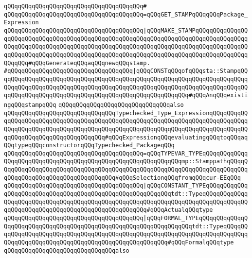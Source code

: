 \verb|qQQqqQQqqQQqqQQqqQQqqQQqqQQqqQQqqQQqqQQq#|\newline
\verb|qQQqqQQqqQQqqQQqqQQqqQQqqQQqqQQqqQQqqQQq=qQQqGET_STAMPqQQqqQQqPackage_Expression|\newline
\verb|qQQqqQQqqQQqqQQqqQQqqQQqqQQqqQQqqQQqqQQq|\verb#|qQQqMAKE_STAMPqQQqqQQqqQQqqQQqqQQqqQQqqQQqqQQqqQQqqQQqqQQqqQQqqQQqqQQqqQQqqQQqqQQqqQQqqQQqqQQqqQQqqQQqqQQqqQQqqQQqqQQqqQQqqQQqqQQqqQQqqQQqqQQqqQQqqQQqqQQqqQQqqQQqqQQqqQQqqQQqqQQqqQQqqQQqqQQqqQQqqQQqqQQqqQQqqQQqqQQqqQQqqQQqqQQqqQQqqQQqqQQqqQQqqQQq#\verb|#qQQqGenerateqQQqaqQQqnewqQQqstamp.|\newline
\verb|#qQQqqQQqqQQqqQQqqQQqqQQqqQQqqQQqqQQq|\verb#|qQQqCONSTqQQqofqQQqsta::StampqQQqqQQqqQQqqQQqqQQqqQQqqQQqqQQqqQQqqQQqqQQqqQQqqQQqqQQqqQQqqQQqqQQqqQQqqQQqqQQqqQQqqQQqqQQqqQQqqQQqqQQqqQQqqQQqqQQqqQQqqQQqqQQqqQQqqQQqqQQqqQQqqQQqqQQqqQQqqQQqqQQqqQQqqQQqqQQqqQQqqQQqqQQqqQQqqQQq#\verb|#qQQqAnqQQqexistingqQQqstampqQQq|\newline
\newline
\verb|qQQqqQQqqQQqqQQqqQQqqQQqqQQqqQQqalso|\newline
\verb|qQQqqQQqqQQqqQQqqQQqqQQqqQQqqQQqTypechecked_Type_ExpressionqQQqqQQqqQQqqQQqqQQqqQQqqQQqqQQqqQQqqQQqqQQqqQQqqQQqqQQqqQQqqQQqqQQqqQQqqQQqqQQqqQQqqQQqqQQqqQQqqQQqqQQqqQQqqQQqqQQqqQQqqQQqqQQqqQQqqQQqqQQqqQQqqQQqqQQqqQQqqQQqqQQqqQQqqQQqqQQqqQQq#qQQqExpressionqQQqevaluatingqQQqtoqQQqaqQQqtypeqQQqconstructorqQQqTypechecked_PackageqQQq|\newline
\verb|qQQqqQQqqQQqqQQqqQQqqQQqqQQqqQQqqQQqqQQq=qQQqTYPEVAR_TYPEqQQqqQQqqQQqqQQqqQQqqQQqqQQqqQQqqQQqqQQqqQQqqQQqqQQqqQQqqQQqqQQqmp::StamppathqQQqqQQqqQQqqQQqqQQqqQQqqQQqqQQqqQQqqQQqqQQqqQQqqQQqqQQqqQQqqQQqqQQqqQQqqQQqqQQqqQQqqQQqqQQqqQQqqQQqqQQqqQQq#qQQqSelectionqQQqfromqQQqcur-EEqQQq|\newline
\verb|qQQqqQQqqQQqqQQqqQQqqQQqqQQqqQQqqQQqqQQq|\verb#|qQQqCONSTANT_TYPEqQQqqQQqqQQqqQQqqQQqqQQqqQQqqQQqqQQqqQQqqQQqqQQqqQQqqQQqqQQqtdt::TypeqQQqqQQqqQQqqQQqqQQqqQQqqQQqqQQqqQQqqQQqqQQqqQQqqQQqqQQqqQQqqQQqqQQqqQQqqQQqqQQqqQQqqQQqqQQqqQQqqQQqqQQqqQQqqQQqqQQqqQQqqQQq#\verb|#qQQqActualqQQqtype|\newline
\verb|qQQqqQQqqQQqqQQqqQQqqQQqqQQqqQQqqQQqqQQq|\verb#|qQQqFORMAL_TYPEqQQqqQQqqQQqqQQqqQQqqQQqqQQqqQQqqQQqqQQqqQQqqQQqqQQqqQQqqQQqqQQqqQQqtdt::TypeqQQqqQQqqQQqqQQqqQQqqQQqqQQqqQQqqQQqqQQqqQQqqQQqqQQqqQQqqQQqqQQqqQQqqQQqqQQqqQQqqQQqqQQqqQQqqQQqqQQqqQQqqQQqqQQqqQQqqQQqqQQq#\verb|#qQQqFormalqQQqtype|\newline
\newline
\verb|qQQqqQQqqQQqqQQqqQQqqQQqqQQqqQQqalso|\newline
